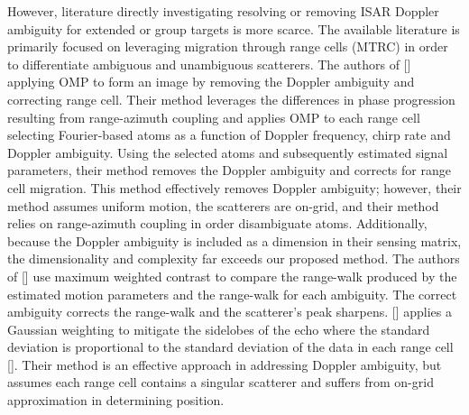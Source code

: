 


However, literature directly investigating resolving or removing ISAR Doppler ambiguity for extended or group targets is more scarce. The available literature is primarily focused on leveraging migration through range cells (MTRC) in order to differentiate ambiguous and unambiguous scatterers. The authors of [] applying OMP to form an image by removing the Doppler ambiguity and correcting range cell. Their method leverages the differences in phase progression resulting from range-azimuth coupling and applies OMP to each range cell selecting Fourier-based atoms as a function of Doppler frequency, chirp rate and Doppler ambiguity. Using the selected atoms and subsequently estimated signal parameters, their method removes the Doppler ambiguity and corrects for range cell migration. This method effectively removes Doppler ambiguity; however, their method assumes uniform motion, the scatterers are on-grid, and their method relies on range-azimuth coupling in order disambiguate atoms. Additionally, because the Doppler ambiguity is included as a dimension in their sensing matrix, the dimensionality and complexity far exceeds our proposed method. The authors of [] use maximum weighted contrast to compare the range-walk produced by the estimated motion parameters and the range-walk for each ambiguity. The correct ambiguity corrects the range-walk and the scatterer's peak sharpens. [] applies a Gaussian weighting to mitigate the sidelobes of the echo where the standard deviation is proportional to the standard deviation of the data in each range cell []. Their method is an effective approach in addressing Doppler ambiguity, but assumes each range cell contains a singular scatterer and suffers from on-grid approximation in determining position.




